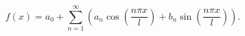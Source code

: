 \documentclass{article}
\begin{document}
	\[
	f(x)=a_0+\sum_{n=1}^{\infty}\left(a_n\cos\left(\frac{n\pi x}{l}\right)+b_n\sin\left(\frac{n\pi x}{l}\right)\right).
	\]
\end{document}
